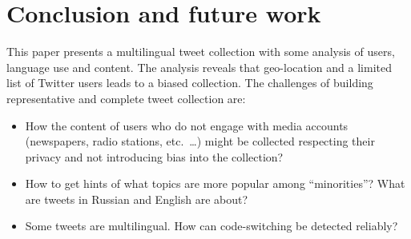 \documentclass{IOS-Book-Article}
\begin{document}


\section{Conclusion and future work}
\label{sec:conclusion}


This paper presents a multilingual tweet collection with some analysis of users, language use and content. The analysis reveals that geo-location and a limited list of Twitter users leads to a biased collection.
%
%
The challenges of building representative and complete tweet collection are:
\begin{itemize}
\item How the content of users who do not engage with media accounts (newspapers, radio stations, etc.~\ldots) might be collected respecting their privacy and not introducing bias into the collection?
\item How to get hints of what topics are more popular among ``minorities''? What are tweets in Russian and English are about?
\item Some tweets are multilingual. How can code-switching be detected reliably?
\end{itemize}





\end{document}
